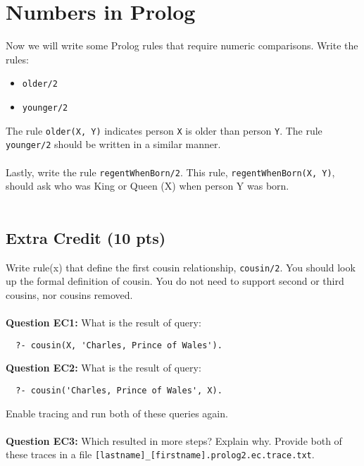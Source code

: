 \documentclass{article}
\begin{document}
\section*{Numbers in Prolog}
Now we will write some Prolog rules that require numeric comparisons. Write the rules:
\begin{itemize}
 \item \verb|older/2|
 \item \verb|younger/2|
\end{itemize}

\noindent The rule \verb|older(X, Y)| indicates person \verb|X| is older than person \verb|Y|. The rule \verb|younger/2| should be written in a similar manner.
\\\\
\noindent Lastly, write the rule \verb|regentWhenBorn/2|. This rule, \verb|regentWhenBorn(X, Y)|, should ask who was King or Queen (X) when person Y was born.
\\\\

\begin{tcolorbox}
 \section*{Extra Credit (10 pts)}
 Write rule(x) that define the first cousin relationship, \verb|cousin/2|. You should look up the formal definition of cousin. You do not need to support second or third cousins, nor cousins removed.
 \\\\
 \noindent \textbf{Question EC1:} What is the result of query:
 \begin{lstlisting}
  ?- cousin(X, 'Charles, Prince of Wales').
 \end{lstlisting}
 \noindent \textbf{Question EC2:} What is the result of query:
 \begin{lstlisting}
  ?- cousin('Charles, Prince of Wales', X).
 \end{lstlisting}
 \noindent Enable tracing and run both of these queries again.
 \\\\
 \noindent \textbf{Question EC3:} Which resulted in more steps? Explain why. Provide both of these traces in a file \verb|[lastname]_[firstname].prolog2.ec.trace.txt|.
\end{tcolorbox}
\end{document}
